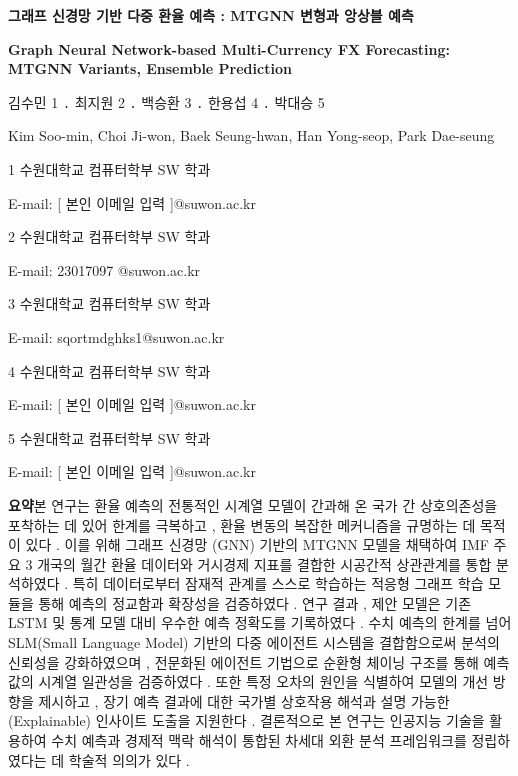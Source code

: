 \documentclass[10pt,a4paper]{article}
\begin{document}
\begin{center}
{\LARGE\bfseries 그래프 신경망 기반 다중 환율 예측 : MTGNN 변형과 앙상블 예측 \par}
\vspace{2mm}
{\large\bfseries Graph Neural Network-based Multi-Currency FX Forecasting: MTGNN Variants, Ensemble Prediction \par}
\vspace{3mm}
{\normalsize 김수민 1 ․ 최지원 2 ․ 백승환 3 ․ 한용섭 4 ․ 박대승 5 \par}
{\normalsize Kim Soo-min, Choi Ji-won, Baek Seung-hwan, Han Yong-seop, Park Dae-seung \par}
\vspace{2mm}
{\small 1 수원대학교 컴퓨터학부 SW 학과 \par}
{\small E-mail: [ 본인 이메일 입력 ]@suwon.ac.kr \par}
{\small 2 수원대학교 컴퓨터학부 SW 학과 \par}
{\small E-mail: 23017097 @suwon.ac.kr \par}
{\small 3 수원대학교 컴퓨터학부 SW 학과 \par}
{\small E-mail: sqortmdghks1@suwon.ac.kr \par}
{\small 4 수원대학교 컴퓨터학부 SW 학과 \par}
{\small E-mail: [ 본인 이메일 입력 ]@suwon.ac.kr \par}
{\small 5 수원대학교 컴퓨터학부 SW 학과 \par}
{\small E-mail: [ 본인 이메일 입력 ]@suwon.ac.kr \par}
\end{center}
\vspace{1mm}
\noindent\textbf{요약}\quad 본 연구는 환율 예측의 전통적인 시계열 모델이 간과해 온 국가 간 상호의존성을 포착하는 데 있어 한계를 극복하고 , 환율 변동의 복잡한 메커니즘을 규명하는 데 목적이 있다 . 이를 위해 그래프 신경망 (GNN) 기반의 MTGNN 모델을 채택하여 IMF 주요 3 개국의 월간 환율 데이터와 거시경제 지표를 결합한 시공간적 상관관계를 통합 분석하였다 . 특히 데이터로부터 잠재적 관계를 스스로 학습하는 적응형 그래프 학습 모듈을 통해 예측의 정교함과 확장성을 검증하였다 . 연구 결과 , 제안 모델은 기존 LSTM 및 통계 모델 대비 우수한 예측 정확도를 기록하였다 . 수치 예측의 한계를 넘어 SLM(Small Language Model) 기반의 다중 에이전트 시스템을 결합함으로써 분석의 신뢰성을 강화하였으며 , 전문화된 에이전트 기법으로 순환형 체이닝 구조를 통해 예측값의 시계열 일관성을 검증하였다 . 또한 특정 오차의 원인을 식별하여 모델의 개선 방향을 제시하고 , 장기 예측 결과에 대한 국가별 상호작용 해석과 설명 가능한 (Explainable) 인사이트 도출을 지원한다 . 결론적으로 본 연구는 인공지능 기술을 활용하여 수치 예측과 경제적 맥락 해석이 통합된 차세대 외환 분석 프레임워크를 정립하였다는 데 학술적 의의가 있다 .
\end{document}
